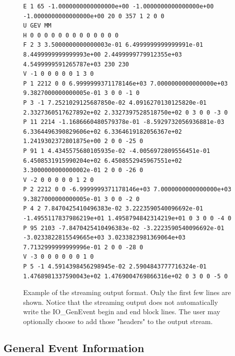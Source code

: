 \documentclass[11pt,letterpaper]{article}
\begin{document}
\begin{figure}[h]
  \begin{center}
{\tiny \begin{verbatim}
E 1 65 -1.0000000000000000e+00 -1.0000000000000000e+00 -1.0000000000000000e+00 20 0 357 1 2 0 0
U GEV MM
H 0 0 0 0 0 0 0 0 0 0 0 0 0
F 2 3 3.5000000000000003e-01 6.4999999999999991e-01 8.4499999999999993e+00 2.4499999779912355e+03 4.5499999591265787e+03 230 230
V -1 0 0 0 0 0 1 3 0
P 1 2212 0 0 6.9999999371178146e+03 7.0000000000000000e+03 9.3827000000000005e-01 3 0 0 -1 0
P 3 -1 7.2521029125687850e-02 4.0916270130125820e-01 2.3327360517627892e+02 2.3327397528518750e+02 0 3 0 0 -3 0
P 11 2214 -1.1686660480579378e-01 -8.5929732056936881e-03 6.3364496390829606e+02 6.3364619182056367e+02 1.2419302372801875e+00 2 0 0 -25 0
P 91 1 4.4345575680105935e-02 -4.0056972809556451e-01 6.4508531915990204e+02 6.4508552945967551e+02 3.3000000000000002e-01 2 0 0 -26 0
V -2 0 0 0 0 0 1 2 0
P 2 2212 0 0 -6.9999999371178146e+03 7.0000000000000000e+03 9.3827000000000005e-01 3 0 0 -2 0
P 4 2 7.8470425410496383e-02 3.2223590540096692e-01 -1.4955117837986219e+01 1.4958794842314219e+01 0 3 0 0 -4 0
P 95 2103 -7.8470425410496383e-02 -3.2223590540096692e-01 -3.0233822815549665e+03 3.0233823981369064e+03 7.7132999999999996e-01 2 0 0 -28 0
V -3 0 0 0 0 0 0 1 0
P 5 -1 4.5914398456298945e-02 2.5904843777716324e-01 1.4768981337590043e+02 1.4769004769866316e+02 0 3 0 0 -5 0
\end{verbatim}}
  \end{center}
  \caption[Example of ascii format]
          {\label{ascii_stream} Example of the streaming output format.
           Only the first few lines are shown. 
	   Notice that the streaming output does not automatically
	   write the IO\_GenEvent begin and end block lines.
	   The user may optionally choose to add those "headers" to the 
	   output stream. }
\end{figure}

\clearpage

%
%

\subsection{General Event Information}
\end{document}
